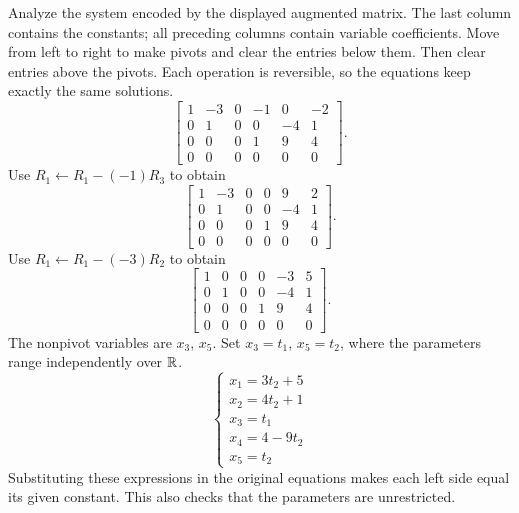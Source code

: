 \goal Analyze the system encoded by the displayed augmented matrix. The last column contains the constants; all preceding columns contain variable coefficients.
\idea Move from left to right to make pivots and clear the entries below them. Then clear entries above the pivots. Each operation is reversible, so the equations keep exactly the same solutions.
\[ \left[\begin{array}{rrrrr|r}1&-3&0&-1&0&-2\\0&1&0&0&-4&1\\0&0&0&1&9&4\\0&0&0&0&0&0\end{array}\right].\]
Use $R_{1}\leftarrow R_{1}-(-1)R_{3}$ to obtain
\[ \left[\begin{array}{rrrrr|r}1&-3&0&0&9&2\\0&1&0&0&-4&1\\0&0&0&1&9&4\\0&0&0&0&0&0\end{array}\right].\]
Use $R_{1}\leftarrow R_{1}-(-3)R_{2}$ to obtain
\[ \left[\begin{array}{rrrrr|r}1&0&0&0&-3&5\\0&1&0&0&-4&1\\0&0&0&1&9&4\\0&0&0&0&0&0\end{array}\right].\]
The nonpivot variables are $x_{3}$, $x_{5}$. Set $x_{3}=t_{1}$, $x_{5}=t_{2}$, where the parameters range independently over $\mathbb{R}$.
\[ \begin{cases}x_{1}=3 t_{2} + 5\\x_{2}=4 t_{2} + 1\\x_{3}=t_{1}\\x_{4}=4 - 9 t_{2}\\x_{5}=t_{2}\end{cases}\]
Substituting these expressions in the original equations makes each left side equal its given constant. This also checks that the parameters are unrestricted.

